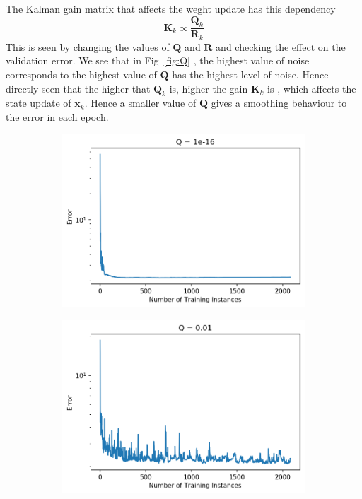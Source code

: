 \documentclass{article}
\begin{document}
The Kalman gain matrix that affects the weght update has this dependency
\[ \boldsymbol{K}_k \propto \frac{\boldsymbol{Q}_k}{\boldsymbol{R}_k}\]
This is seen by changing the values of  $\boldsymbol{Q}$ and $\boldsymbol{R}$ and checking the effect on the validation error. We see that in Fig~\ref{fig:Q} , the highest value of noise corresponds to the highest value of $\boldsymbol{Q}$ has the highest level of noise. Hence directly seen that the higher that $\boldsymbol{Q}_k$ is, higher the gain $\boldsymbol{K}_k$ is , which affects the state update of $\boldsymbol{x}_k$. Hence a smaller value of $\boldsymbol{Q}$ gives a smoothing behaviour to the error in each epoch.
\begin{figure}[ht]
    \centering
    \begin{subfigure}[b]{0.5\linewidth}
        \includegraphics[width=\linewidth]{Q1e-16.png}
        \caption{}
        \label{fig:Q1e-16}
    \end{subfigure}%
    \begin{subfigure}[b]{0.5\linewidth}
        \includegraphics[width=\textwidth]{Q001.png}
        \caption{}
        \label{fig:Q1e-2}
    \end{subfigure}%
    

\end{figure}
\end{document}
